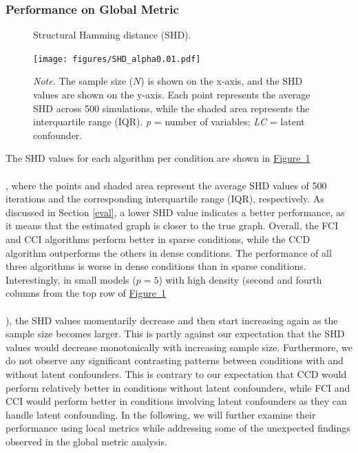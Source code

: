 \documentclass[twoside, 11pt]{article}
\newcommand*{\figref}[2][]{%
  \hyperref[{fig:#2}]{%
    Figure~\ref*{fig:#2}%
    \ifx\\#1\\%
    \else
      #1%
    \fi
  }%
}
\begin{document}
\subsubsection{Performance on Global Metric} \label{overallperformance}


\begin{figure}[!b]
    \centering
        \caption{Structural Hamming distance (SHD).}
        \vspace{1mm}
        \texttt{[image: figures/SHD\_alpha0.01.pdf]}
        \vspace*{-4mm}
        \caption*{\small{\textit{Note.} The sample size ($N$) is shown on the x-axis, and the SHD values are shown on the y-axis. Each point represents the average SHD across 500 simulations, while the shaded area represents the interquartile range (IQR). \textit{p} = number of variables; \textit{LC} = latent confounder.}}
    \label{fig:13}
\end{figure}

The SHD values for each algorithm per condition are shown in \figref[]{13}, where the points and shaded area represent the average SHD values of 500 iterations and the corresponding interquartile range (IQR), respectively. As discussed in Section \ref{eval}, a lower SHD value indicates a better performance, as it means that the estimated graph is closer to the true graph. Overall, the FCI and CCI algorithms perform better in sparse conditions, while the CCD algorithm outperforms the others in dense conditions. The performance of all three algorithms is worse in dense conditions than in sparse conditions. Interestingly, in small models ($p=5$) with high density (second and fourth columns from the top row of \figref[]{13}), the SHD values momentarily decrease and then start increasing again as the sample size becomes larger. This is partly against our expectation that the SHD values would decrease monotonically with increasing sample size. Furthermore, we do not observe any significant contrasting patterns between conditions with and without latent confounders. This is contrary to our expectation that CCD would perform relatively better in conditions without latent confounders, while FCI and CCI would perform better in conditions involving latent confounders as they can handle latent confounding.
In the following, we will further examine their performance using local metrics while addressing some of the unexpected findings observed in the global metric analysis.
\end{document}
